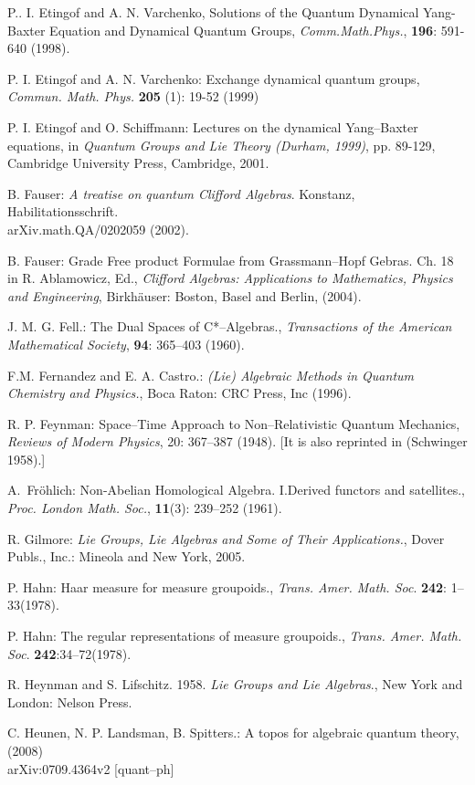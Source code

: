 \documentclass[12pt]{article}
\theoremstyle{plain}
\theoremstyle{definition}
\numberwithin{equation}{section}
\newcommand{\<}{{\langle}}
\begin{document}
\begin{thebibliography}{9}
P.. I. Etingof and A. N. Varchenko, Solutions of the Quantum Dynamical Yang-Baxter Equation and Dynamical Quantum Groups, \emph{Comm.Math.Phys.}, \textbf{196}: 591-640 (1998).

P. I. Etingof and A. N. Varchenko: Exchange dynamical quantum
groups, \emph{Commun. Math. Phys.} \textbf{205} (1): 19-52 (1999)

P. I. Etingof and O. Schiffmann: Lectures on the dynamical Yang--Baxter equations, in \emph{Quantum Groups and Lie Theory (Durham, 1999)}, pp. 89-129, Cambridge University Press, Cambridge, 2001.

B. Fauser: \emph{A treatise on quantum Clifford Algebras}. Konstanz,
Habilitationsschrift. \\ arXiv.math.QA/0202059 (2002).

B. Fauser: Grade Free product Formulae from Grassmann--Hopf Gebras.
Ch. 18 in R. Ablamowicz, Ed., \emph{Clifford Algebras: Applications to Mathematics, Physics and Engineering}, Birkh\"{a}user: Boston, Basel and Berlin, (2004).

J. M. G. Fell.: The Dual Spaces of  C*--Algebras., \emph{Transactions of the American
Mathematical Society}, \textbf{94}: 365--403 (1960).

F.M. Fernandez and E. A. Castro.:  \textit{(Lie) Algebraic Methods in Quantum Chemistry and Physics.}, Boca Raton: CRC Press, Inc  (1996).

 R. P. Feynman: Space--Time Approach to Non--Relativistic Quantum Mechanics, {\em Reviews 
of Modern Physics}, 20: 367--387 (1948). [It is also reprinted in (Schwinger 1958).]

A.~Fr{\"o}hlich: Non-Abelian Homological Algebra. {I}.{D}erived functors and satellites.\/, 
\emph{Proc. London Math. Soc.}, \textbf{11}(3): 239--252 (1961).

R. Gilmore: \textit{Lie Groups, Lie Algebras and Some of Their Applications.},
Dover Publs., Inc.: Mineola and New York, 2005.

P. Hahn: Haar measure for measure groupoids., \textit{Trans. Amer. Math. Soc}. \textbf{242}: 1--33(1978).

P. Hahn: The regular representations of measure groupoids., \textit{Trans. Amer. Math. Soc}. \textbf{242}:34--72(1978).

R. Heynman and S. Lifschitz. 1958. \emph{Lie Groups and Lie Algebras}., New York and London: Nelson Press.

C. Heunen, N. P. Landsman, B. Spitters.: A topos for algebraic quantum theory, (2008)   \\ 
arXiv:0709.4364v2 [quant--ph]

\end{thebibliography}
\end{document}
